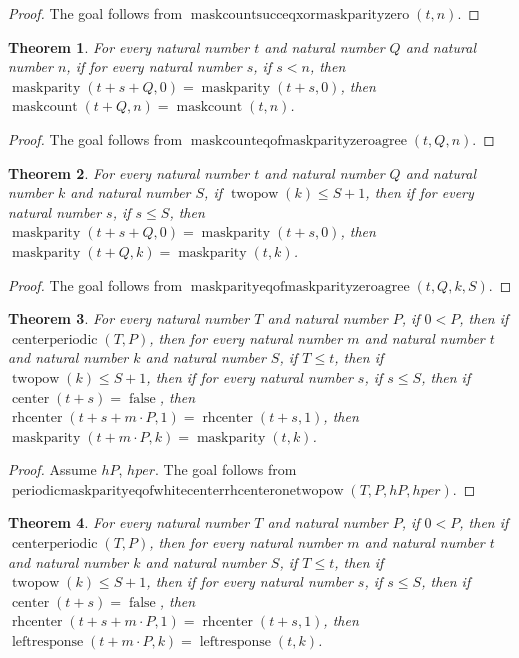 \documentclass[11pt]{article}
\newtheorem{theorem}{Theorem}[section]
\theoremstyle{definition}
\begin{document}
\begin{proof}
The goal follows from \(\operatorname{maskcountsucceqxormaskparityzero}(t, n)\).
\end{proof}
\begin{theorem}
\label{ll:paper:maskcount-eq-of-maskparity-zero-agree}
For every natural number \(t\) and natural number \(Q\) and natural number \(n\), if for every natural number \(s\), if \(s < n\), then \(\operatorname{maskparity}(t + s + Q, 0) = \operatorname{maskparity}(t + s, 0)\), then \(\operatorname{maskcount}(t + Q, n) = \operatorname{maskcount}(t, n)\).
\end{theorem}
\begin{proof}
The goal follows from \(\operatorname{maskcounteqofmaskparityzeroagree}(t, Q, n)\).
\end{proof}
\begin{theorem}
\label{ll:paper:maskparity-eq-of-maskparity-zero-agree}
For every natural number \(t\) and natural number \(Q\) and natural number \(k\) and natural number \(S\), if \(\operatorname{twopow}(k) \le S + 1\), then if for every natural number \(s\), if \(s \le S\), then \(\operatorname{maskparity}(t + s + Q, 0) = \operatorname{maskparity}(t + s, 0)\), then \(\operatorname{maskparity}(t + Q, k) = \operatorname{maskparity}(t, k)\).
\end{theorem}
\begin{proof}
The goal follows from \(\operatorname{maskparityeqofmaskparityzeroagree}(t, Q, k, S)\).
\end{proof}
\begin{theorem}
\label{ll:paper:periodic-maskparity-eq-of-white-center-rhcenter-one-twopow}
For every natural number \(T\) and natural number \(P\), if \(0 < P\), then if \(\operatorname{centerperiodic}(T, P)\), then for every natural number \(m\) and natural number \(t\) and natural number \(k\) and natural number \(S\), if \(T \le t\), then if \(\operatorname{twopow}(k) \le S + 1\), then if for every natural number \(s\), if \(s \le S\), then if \(\operatorname{center}(t + s) = \operatorname{false}\), then \(\operatorname{rhcenter}(t + s + m \cdot P, 1) = \operatorname{rhcenter}(t + s, 1)\), then \(\operatorname{maskparity}(t + m \cdot P, k) = \operatorname{maskparity}(t, k)\).
\end{theorem}
\begin{proof}
Assume \(hP\), \(hper\).
The goal follows from \(\operatorname{periodicmaskparityeqofwhitecenterrhcenteronetwopow}(T, P, hP, hper)\).
\end{proof}
\begin{theorem}
\label{ll:paper:periodic-leftresponse-eq-of-white-center-rhcenter-one-twopow}
For every natural number \(T\) and natural number \(P\), if \(0 < P\), then if \(\operatorname{centerperiodic}(T, P)\), then for every natural number \(m\) and natural number \(t\) and natural number \(k\) and natural number \(S\), if \(T \le t\), then if \(\operatorname{twopow}(k) \le S + 1\), then if for every natural number \(s\), if \(s \le S\), then if \(\operatorname{center}(t + s) = \operatorname{false}\), then \(\operatorname{rhcenter}(t + s + m \cdot P, 1) = \operatorname{rhcenter}(t + s, 1)\), then \(\operatorname{leftresponse}(t + m \cdot P, k) = \operatorname{leftresponse}(t, k)\).
\end{theorem}
\end{document}
